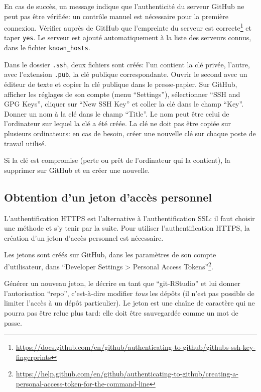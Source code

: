 \documentclass[
  12pt,
  french,
  a4paper,
  extrafontsizes,onecolumn,openright
  ]{memoir}
\begin{document}
En cas de succès, un message indique que l'authenticité du serveur GitHub ne peut pas être vérifiée: un contrôle manuel est nécessaire pour la première connexion.
Vérifier auprès de GitHub que l'empreinte du serveur est correcte\footnote{\url{https://docs.github.com/en/github/authenticating-to-github/githubs-ssh-key-fingerprints}} et taper \texttt{yes}.
Le serveur est ajouté automatiquement à la liste des serveurs connus, dans le fichier \texttt{known\_hosts}.

Dans le dossier \texttt{.ssh}, deux fichiers sont créés: l'un contient la clé privée, l'autre, avec l'extension \texttt{.pub}, la clé publique correspondante.
Ouvrir le second avec un éditeur de texte et copier la clé publique dans le presse-papier.
Sur GitHub, afficher les réglages de son compte (menu \enquote{Settings}), sélectionner \enquote{SSH and GPG Keys}, cliquer sur \enquote{New SSH Key} et coller la clé dans le champ \enquote{Key}.
Donner un nom à la clé dans le champ \enquote{Title}.
Le nom peut être celui de l'ordinateur sur lequel la clé a été créée.
La clé ne doit pas être copiée sur plusieurs ordinateurs: en cas de besoin, créer une nouvelle clé sur chaque poste de travail utilisé.

Si la clé est compromise (perte ou prêt de l'ordinateur qui la contient), la supprimer sur GitHub et en créer une nouvelle.

\subsection{Obtention d'un jeton d'accès personnel}\label{sec:pat}

L'authentification HTTPS est l'alternative à l'authentification SSL: il faut choisir une méthode et s'y tenir par la suite.
Pour utiliser l'authentification HTTPS, la création d'un jeton d'accès personnel est nécessaire.

Les jetons sont créés sur GitHub, dans les paramètres de son compte d'utilisateur, dans \enquote{Developer Settings \textgreater{} Personal Access Tokens}\footnote{\url{https://help.github.com/en/github/authenticating-to-github/creating-a-personal-access-token-for-the-command-line}}.

Générer un nouveau jeton, le décrire en tant que \enquote{git-RStudio} et lui donner l'autorisation \enquote{repo}, c'est-à-dire modifier \emph{tous} les dépôts (il n'est pas possible de limiter l'accès à un dépôt particulier).
Le jeton est une chaîne de caractère qui ne pourra pas être relue plus tard: elle doit être sauvegardée comme un mot de passe.
\end{document}
